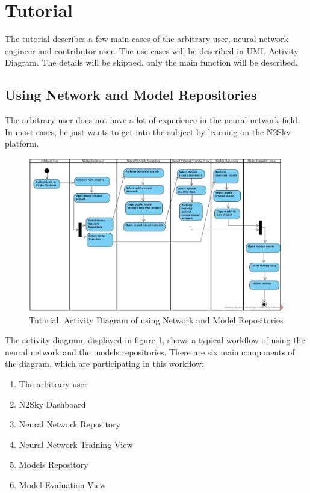 \section{Tutorial}\label{Tutorial}

The tutorial describes a few main cases of the arbitrary user, neural network engineer and contributor user. The use cases will be described in UML Activity Diagram. The details will be skipped, only the main function will be described.  

\subsection{Using Network and Model Repositories}\label{Using Network and Model Repositories}

The arbitrary user does not have a lot of experience in the neural network field. In most cases, he just wants to get into the subject by learning on the N2Sky platform. 

\begin{figure}[htbp]
\begin{center}
  \includegraphics[width=\linewidth]{components/tutorial/img/training_arbitrary.jpg}
  \caption{Tutorial. Activity Diagram of using Network and Model Repositories}
  \label{fig:training_arbitrary}
\end{center}
\end{figure} 

The activity diagram, displayed in figure \ref{fig:training_arbitrary}, shows a typical workflow of using the neural network and the models repositories. There are six main components of the diagram, which are participating in this workflow: 
\begin{enumerate}
\item The arbitrary user
\item N2Sky Dashboard
\item Neural Network Repository
\item Neural Network Training View
\item Models Repository
\item Model Evaluation View
\end{enumerate}


